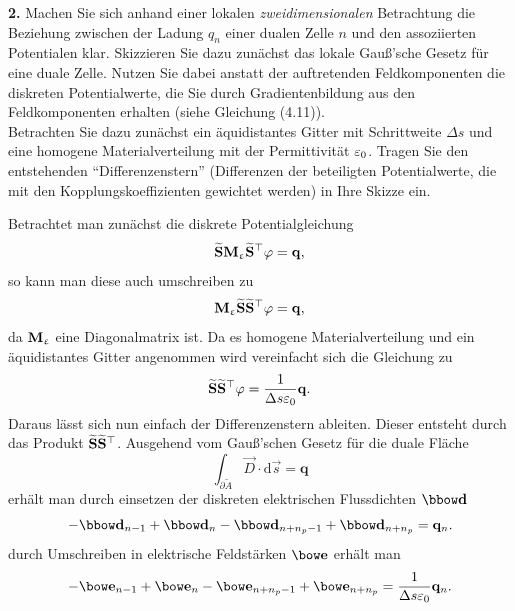 \documentclass[Protokollheft.tex]{subfiles}
\begin{document}
\begin{framed}
	\noindent \textbf{2.} Machen Sie sich anhand einer lokalen \emph{zweidimensionalen}
Betrachtung die Beziehung zwischen der Ladung $q_n$ einer dualen Zelle $n$ und
den assoziierten Potentialen klar. Skizzieren
Sie dazu zunächst das lokale Gauß'sche Gesetz für eine duale
Zelle. Nutzen Sie dabei anstatt der auftretenden Feldkomponenten 
die diskreten Potentialwerte, die Sie durch Gradientenbildung aus den 
Feldkomponenten erhalten (siehe Gleichung (4.11)).\\
Betrachten Sie dazu zunächst ein äquidistantes Gitter mit
Schrittweite $\Delta s$ und eine homogene Materialverteilung mit der
Permittivität $\varepsilon_0$. Tragen Sie den entstehenden
"`Differenzenstern"' (Differenzen der beteiligten Potentialwerte,
die mit den Kopplungskoeffizienten gewichtet werden) in Ihre
Skizze ein.\label{exer:diffStar}
\end{framed}
\noindent
Betrachtet man zunächst die diskrete Potentialgleichung
\begin{equation*}
\widetilde{\mathbf{S}}\mathbf{M}_{\upvarepsilon}\widetilde{\mathbf{S}}^\top\varphi=\mathbf{q},
\end{equation*}
so kann man diese auch umschreiben zu
\begin{equation*}
	\mathbf{M}_{\upvarepsilon}\widetilde{\mathbf{S}}\widetilde{\mathbf{S}}^\top\varphi=\mathbf{q},
\end{equation*}
da $\mathbf{M}_{\upvarepsilon}$ eine Diagonalmatrix ist. Da es homogene Materialverteilung und ein äquidistantes Gitter angenommen wird vereinfacht sich die Gleichung zu
\begin{equation}
	\widetilde{\mathbf{S}}\widetilde{\mathbf{S}}^\top\varphi=\frac{1}{\Delta s\varepsilon_0}\mathbf{q}.
	\label{eq:SSphi}
\end{equation}
Daraus lässt sich nun einfach der Differenzenstern ableiten. Dieser entsteht durch das Produkt $\widetilde{\mathbf{S}}\widetilde{\mathbf{S}}^\top$. Ausgehend vom Gauß'schen Gesetz für die duale Fläche
\begin{equation*}
\int_{\partial \tilde{A}}\vec{D}\cdot\text{d}\vec{s}=\mathbf{q}
\end{equation*}
erhält man durch einsetzen der diskreten elektrischen Flussdichten $\dfit$
\begin{equation*}
-\dfit_{n-1}+\dfit_{n}-\dfit_{n+n_p-1}+\dfit_{n+n_p}=\mathbf{q}_n.
\end{equation*}
durch Umschreiben in elektrische Feldstärken $\efit$ erhält man
\begin{equation*}
	-\efit_{n-1}+\efit_{n}-\efit_{n+n_p-1}+\efit_{n+n_p}=\frac{1}{\Delta s\varepsilon_0}\mathbf{q}_n.
\end{equation*}
\end{document}

